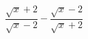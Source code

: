 \hspace*{2mm}\begin{minipage}[t]{\dimexpr\linewidth-2mm\relax}\vspace{0pt}
$\dfrac{\sqrt{x}+2}{\sqrt{x}-2}-\dfrac{\sqrt{x}-2}{\sqrt{x}+2}$\end{minipage}
